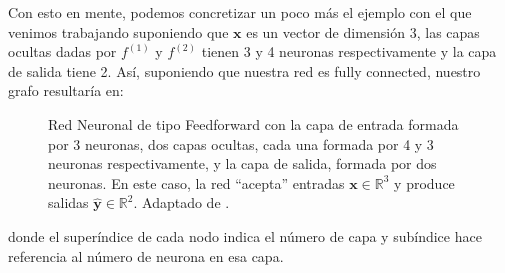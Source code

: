 \documentclass[../../main.tex]{subfiles}
\begin{document}
Con esto en mente, podemos concretizar un poco más el ejemplo con el que venimos
trabajando suponiendo que \(\bm{x}\) es un vector de dimensión 3, las capas ocultas
dadas por \(f^{(1)}\) y \(f^{(2)}\) tienen 3 y 4 neuronas respectivamente y la capa de
salida tiene 2. Así, suponiendo que nuestra red es fully connected, nuestro grafo
resultaría en:
\begin{figure}
    \centering
    \caption{Red Neuronal de tipo Feedforward con la capa de entrada formada por 3
    neuronas, dos capas ocultas, cada una formada por 4 y 3 neuronas respectivamente, y la
    capa de salida, formada por dos neuronas. En este caso, la red ``acepta'' entradas
    \(\bm{x} \in \mathbb{R}^3\) y produce salidas \(\bm{\hat{y}} \in \mathbb{R}^2\).
    Adaptado de \cite{tikz-neural-networks}.}
    \label{fig:ff-neural-network}
\end{figure}
donde el superíndice de cada nodo indica el número de capa y subíndice hace referencia al
número de neurona en esa capa.
\end{document}
